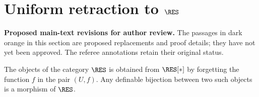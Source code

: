 \section{Uniform retraction to $\RES$}
\label{sec:retract}

{\normalfont\small\color{SectionFourProposal}
\noindent\textbf{Proposed main-text revisions for author review.}
The passages in dark orange in this section are proposed replacements and
proof details; they have not yet been approved. The referee annotations
retain their original status.\par}

\begin{defn}\label{df:res}
The objects of the category $\RES$ is obtained from $\RES[*]$ by forgetting the function $f$ in the pair $(U, f)$. Any definable bijection between two such objects is a morphism of $\RES$.

\end{defn}


